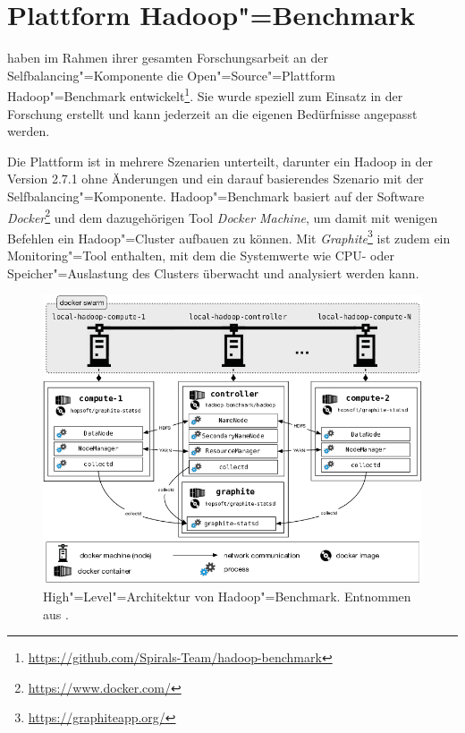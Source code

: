 \section{Plattform Hadoop"=Benchmark}
\label{sec:hadoopBenchmark}

\citeauthor{zhang2016} haben im Rahmen ihrer gesamten Forschungsarbeit an der Selfbalancing"=Komponente die Open"=Source"=Plattform Hadoop"=Benchmark entwickelt\footnote{\url{https://github.com/Spirals-Team/hadoop-benchmark}}.
Sie wurde speziell zum Einsatz in der Forschung erstellt und kann jederzeit an die eigenen Bedürfnisse angepasst werden.

Die Plattform ist in mehrere Szenarien unterteilt, darunter ein Hadoop in der Version 2.7.1 ohne Änderungen und ein darauf basierendes Szenario mit der Selfbalancing"=Komponente.
Hadoop"=Benchmark basiert auf der Software \emph{Docker}\footnote{\url{https://www.docker.com/}} und dem dazugehörigen Tool \emph{Docker Machine}, um damit mit wenigen Befehlen ein Hadoop"=Cluster aufbauen zu können.
Mit \emph{Graphite}\footnote{\url{https://graphiteapp.org/}} ist zudem ein Monitoring"=Tool enthalten, mit dem die Systemwerte wie CPU- oder Speicher"=Auslastung des Clusters überwacht und analysiert werden kann.

\begin{figure}
    \includegraphics{./images/hadoopBenchmarkArch.png}
    \caption[High"=Level"=Architektur von Hadoop"=Benchmark]
    {High"=Level"=Architektur von Hadoop"=Benchmark.
        Entnommen aus \cite{abb:hadoopBenchmarkArch}.}
    \label{fig:hadoopBenchmarkArchitecture}
\end{figure}

